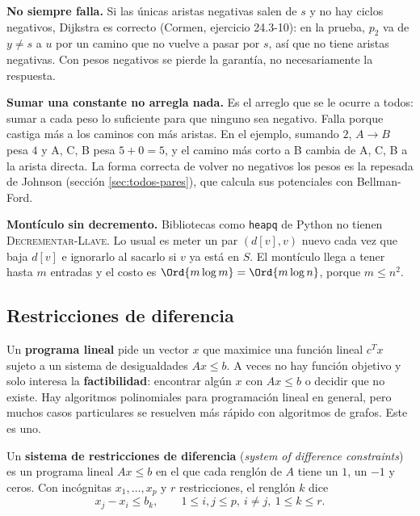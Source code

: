 \documentclass[11pt,letterpaper]{article}
\begin{document}
\begin{ojo}
  \textbf{No siempre falla.} Si las únicas aristas negativas salen de
  $s$ y no hay ciclos negativos, Dijkstra es correcto (Cormen,
  ejercicio 24.3-10): en la prueba, $p_2$ va de $y \neq s$ a $u$ por
  un camino que no vuelve a pasar por $s$, así que no tiene aristas
  negativas. Con pesos negativos se pierde la garantía, no
  necesariamente la respuesta.

  \smallskip
  \textbf{Sumar una constante no arregla nada.} Es el arreglo que se
  le ocurre a todos: sumar a cada peso lo suficiente para que ninguno
  sea negativo. Falla porque castiga más a los caminos con más
  aristas. En el ejemplo, sumando $2$, $A \to B$ pesa $4$ y A, C, B
  pesa $5 + 0 = 5$, y el camino más corto a B cambia de A, C, B a la
  arista directa. La forma correcta de volver no negativos los pesos
  es la repesada de Johnson (sección \ref{sec:todos-pares}), que
  calcula sus potenciales con Bellman-Ford.

  \smallskip
  \textbf{Montículo sin decremento.} Bibliotecas como \texttt{heapq}
  de Python no tienen \textsc{Decrementar-Llave}. Lo usual es meter un
  par $(d[v], v)$ nuevo cada vez que baja $d[v]$ e ignorarlo al
  sacarlo si $v$ ya está en $S$. El montículo llega a tener hasta $m$
  entradas y el costo es $\Ord{m \log m} = \Ord{m \log n}$, porque
  $m \le n^2$.
\end{ojo}


\subsection*{Restricciones de diferencia}

Un \textbf{programa lineal} pide un vector $x$ que maximice una
función lineal $c^{T} x$ sujeto a un sistema de desigualdades
$Ax \le b$. A veces no hay función objetivo y solo interesa la
\textbf{factibilidad}: encontrar algún $x$ con $Ax \le b$ o decidir
que no existe. Hay algoritmos polinomiales para programación lineal en
general, pero muchos casos particulares se resuelven más rápido con
algoritmos de grafos. Este es uno.

\begin{definicion}
  \label{def:restricciones-diferencia}
  Un \textbf{sistema de restricciones de diferencia} (\textit{system
  of difference constraints}) es un programa lineal $Ax \le b$ en el
  que cada renglón de $A$ tiene un $1$, un $-1$ y ceros. Con
  incógnitas $x_1, \dots, x_p$ y $r$ restricciones, el renglón $k$
  dice
  \[
    x_j - x_i \le b_k , \qquad 1 \le i, j \le p,\ i \neq j,\
    1 \le k \le r .
  \]
\end{definicion}
\end{document}
